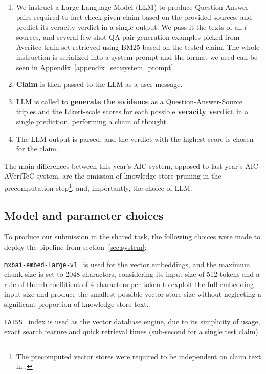 \begin{enumerate}[label=\roman*.]
\begin{enumerate}[label=\arabic*.]  %
    \item We instruct a Large Language Model (LLM) to produce Question-Answer pairs required to fact-check given claim based on the provided sources, and predict its veracity verdict in a single output. We pass it the texts of all $l$ sources, and several few-shot QA-pair generation examples picked from Averitec train set retrieved using BM25 based on the tested claim. The whole instruction is serialized into a system prompt and the format we used can be seen in Appendix~\ref{appendix_sec:system_prompt}.
    \item \textbf{Claim} is then passed to the LLM as a user message.
    \item LLM is called to \textbf{generate the evidence} as a Question-Answer-Source triples and the Likert-scale scores for each possible \textbf{veracity verdict} in a single prediction, performing a chain of thought. 
    \item The LLM output is parsed, and the verdict with the highest score is chosen for the claim.
\end{enumerate}
\end{enumerate}

The main differences between this year's AIC \averitec{} system, opposed to last year's AIC AVeriTeC system, are the omission of knowledge store pruning in the precomputation step\footnote{The precomputed vector stores were required to be independent on claim text in \averitec{}.}, and, importantly, the choice of LLM.
\subsection{Model and parameter choices}
\label{sec:choices}
To produce our submission in the \averitec{} shared task, the following choices were made to deploy the pipeline from section~\ref{sec:system}:

\texttt{mxbai-embed-large-v1}~\cite{li-li-2024-aoe,emb2024mxbai} is used for the vector embeddings, and the maximum chunk size is set to 2048 characters, considering its input size of 512 tokens and a rule-of-thumb coeffitient of 4 characters per token to exploit the full embedding input size and produce the smallest possible vector store size without neglecting a significant proportion of knowledge store text.

\texttt{FAISS}~\cite{douze2024faiss,johnson2019billion} index is used as the vector database engine, due to its simplicity of usage, exact search feature and quick retrieval times (sub-second for a single \averitec{} test claim).

